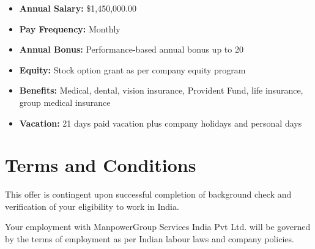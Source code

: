 \documentclass[a4paper,8pt]{article}
\begin{document}
\vspace{0.4cm}


\begin{tcolorbox}[
    colback=green!5!white,
    colframe=green!75!black,
    title=Compensation \& Benefits,
    fonttitle=\bfseries
]

\end{tcolorbox} 

\begin{itemize}[leftmargin=20pt]
    \item \textbf{Annual Salary:} \$1,450,000.00
    \item \textbf{Pay Frequency:} Monthly
    
    \item \textbf{Annual Bonus:} Performance-based annual bonus up to 20%
    
    
    \item \textbf{Equity:} Stock option grant as per company equity program
    
    \item \textbf{Benefits:} Medical, dental, vision insurance, Provident Fund, life insurance, group medical insurance
    
    \item \textbf{Vacation:} 21 days paid vacation plus company holidays and personal days
    
\end{itemize}

\vspace{0.4cm}

\section{Terms and Conditions}


This offer is contingent upon successful completion of background check and verification of your eligibility to work in India.

\vspace{0.25cm}

Your employment with ManpowerGroup Services India Pvt Ltd. will be governed by the terms of employment as per Indian labour laws and company policies.

\vspace{0.25cm}
\end{document}
